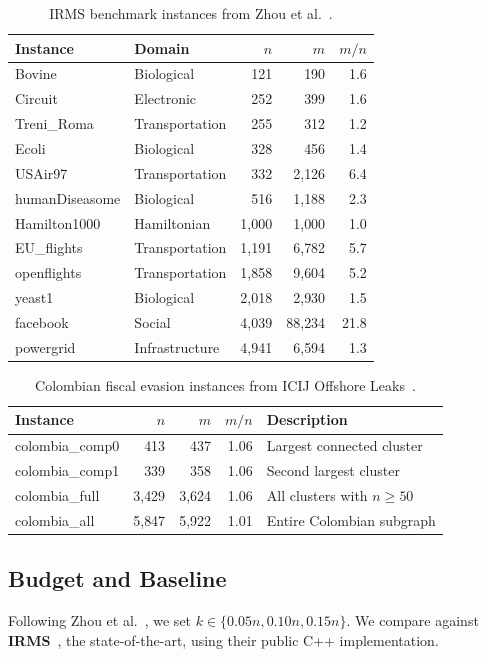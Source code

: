 \documentclass[11pt,a4paper]{article}
\begin{document}
\begin{table}[ht]
\centering
\caption{IRMS benchmark instances from Zhou et al.~\cite{zhou2023}.}
\label{tab:instances}
\begin{tabular}{llrrr}
\toprule
Instance & Domain & $n$ & $m$ & $m/n$ \\
\midrule
Bovine & Biological & 121 & 190 & 1.6 \\
Circuit & Electronic & 252 & 399 & 1.6 \\
Treni\_Roma & Transportation & 255 & 312 & 1.2 \\
Ecoli & Biological & 328 & 456 & 1.4 \\
USAir97 & Transportation & 332 & 2{,}126 & 6.4 \\
humanDiseasome & Biological & 516 & 1{,}188 & 2.3 \\
Hamilton1000 & Hamiltonian & 1{,}000 & 1{,}000 & 1.0 \\
EU\_flights & Transportation & 1{,}191 & 6{,}782 & 5.7 \\
openflights & Transportation & 1{,}858 & 9{,}604 & 5.2 \\
yeast1 & Biological & 2{,}018 & 2{,}930 & 1.5 \\
facebook & Social & 4{,}039 & 88{,}234 & 21.8 \\
powergrid & Infrastructure & 4{,}941 & 6{,}594 & 1.3 \\
\bottomrule
\end{tabular}
\end{table}

\begin{table}[ht]
\centering
\caption{Colombian fiscal evasion instances from ICIJ Offshore Leaks~\cite{icij2021}.}
\label{tab:colombia_instances}
\begin{tabular}{lrrrl}
\toprule
Instance & $n$ & $m$ & $m/n$ & Description \\
\midrule
colombia\_comp0 & 413 & 437 & 1.06 & Largest connected cluster \\
colombia\_comp1 & 339 & 358 & 1.06 & Second largest cluster \\
colombia\_full & 3{,}429 & 3{,}624 & 1.06 & All clusters with $n \geq 50$ \\
colombia\_all & 5{,}847 & 5{,}922 & 1.01 & Entire Colombian subgraph \\
\bottomrule
\end{tabular}
\end{table}

\subsection{Budget and Baseline}
Following Zhou et al.~\cite{zhou2023}, we set $k \in \{0.05n, 0.10n, 0.15n\}$. We compare against \textbf{IRMS}~\cite{zhou2023}, the state-of-the-art, using their public C++ implementation.
\end{document}
